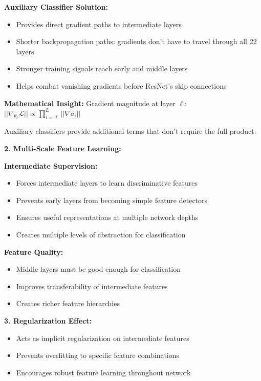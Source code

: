\documentclass[12pt]{article}
\begin{document}
\begin{enumerate}[(a)]
{    \textbf{Auxiliary Classifier Solution:}
    \begin{itemize}
        \item Provides direct gradient paths to intermediate layers
        \item Shorter backpropagation paths: gradients don't have to travel through all 22 layers
        \item Stronger training signals reach early and middle layers
        \item Helps combat vanishing gradients before ResNet's skip connections
    \end{itemize}
    
    \textbf{Mathematical Insight:}
    Gradient magnitude at layer $\ell$: $||\nabla_{\theta_\ell} \mathcal{L}|| \propto \prod_{i=\ell}^L ||\nabla a_i||$
    
    Auxiliary classifiers provide additional terms that don't require the full product.
    
    \textbf{2. Multi-Scale Feature Learning:}
    
    \textbf{Intermediate Supervision:}
    \begin{itemize}
        \item Forces intermediate layers to learn discriminative features
        \item Prevents early layers from becoming simple feature detectors
        \item Ensures useful representations at multiple network depths
        \item Creates multiple levels of abstraction for classification
    \end{itemize}
    
    \textbf{Feature Quality:}
    \begin{itemize}
        \item Middle layers must be good enough for classification
        \item Improves transferability of intermediate features
        \item Creates richer feature hierarchies
    \end{itemize}
    
    \textbf{3. Regularization Effect:}
    \begin{itemize}
        \item Acts as implicit regularization on intermediate features
        \item Prevents overfitting to specific feature combinations
        \item Encourages robust feature learning throughout network
    \end{itemize}
    
}
\end{enumerate}
\end{document}
